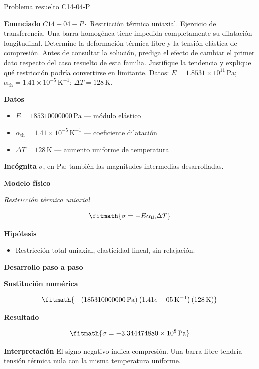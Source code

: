 \documentclass[10pt,openany]{book}
\begin{document}
\begin{studiumworked}{Problema resuelto C14-04-P}


\noindent\textbf{Enunciado}
\(C14-04-P \cdot\) Restricción térmica uniaxial. Ejercicio de transferencia. Una barra homogénea tiene impedida completamente su dilatación longitudinal. Determine la deformación térmica libre y la tensión elástica de compresión. Antes de consultar la solución, prediga el efecto de cambiar el primer dato respecto del caso resuelto de esta familia. Justifique la tendencia y explique qué restricción podría convertirse en limitante. Datos: \(E=1.8531\times 10^{11}\, \mathrm{Pa}\); \(\alpha_{\mathrm{th}}=1.41\times 10^{-5}\, \mathrm{K}^{-1}\); \(\Delta T=128\, \mathrm{K}\).

\noindent\textbf{Datos}
\begin{itemize}
\item $E = 185310000000\,\mathrm{Pa}$ — módulo elástico
\item $\alpha_{\mathrm{th}} = 1.41\times 10^{-5}\,\mathrm{K}^{-1}$ — coeficiente dilatación
\item $\Delta T = 128\,\mathrm{K}$ — aumento uniforme de temperatura
\end{itemize}

\noindent\textbf{Incógnita}
$\sigma$, en $\mathrm{Pa}$; también las magnitudes intermedias desarrolladas.

\noindent\textbf{Modelo físico}

\noindent\textit{Restricción térmica uniaxial}

\[
\fitmath{\sigma=- E \alpha_{\mathrm{th}} \Delta T}
\]

\noindent\textbf{Hipótesis}
\begin{itemize}
\item Restricción total uniaxial, elasticidad lineal, sin relajación.
\end{itemize}

\noindent\textbf{Desarrollo paso a paso}



\noindent\textbf{Sustitución numérica}

\[
\fitmath{- \left(185310000000\,\mathrm{Pa}\right) \left(1.41e-05\,\mathrm{K}^{-1}\right) \left(128\,\mathrm{K}\right)}
\]

\noindent\textbf{Resultado}

\[
\fitmath{\sigma=-3.344474880\times10^{8}\,\mathrm{Pa}}
\]

\noindent\textbf{Interpretación}
El signo negativo indica compresión. Una barra libre tendría tensión térmica nula con la misma temperatura uniforme.


\end{studiumworked}
\end{document}
